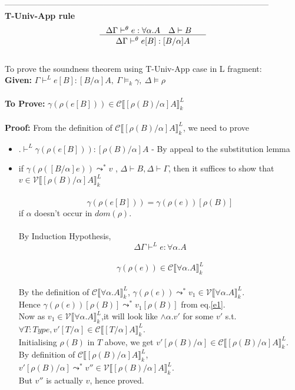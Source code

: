 \documentclass[12pt]{article}
\begin{document}
\\
\\
------------------------------------------------------------------------------------------------\\
\textbf{T-Univ-App rule}\\
$$
\inference{\Delta\Gamma \vdash^{\theta} e:\forall \alpha.A \quad \Delta \vdash
B \quad }{\Delta\Gamma \vdash^{\theta} e[B]:[B/\alpha]A}  
$$
\\
To prove the soundness theorem using T-Univ-App case in L fragment:\\
\textbf{Given:} $\Gamma \vdash^L  e [B] : [B/\alpha]A,\
\Gamma \vDash_k  \gamma,\ \Delta \vDash \rho$\\
\\
\textbf{To Prove:} $\gamma(\rho(e [B])) \in
\mathscr{C}\llbracket [\rho(B)/\alpha]A \rrbracket_k^L$\\
\\
\textbf{Proof:} From the definition of $\mathscr{C}\llbracket
[\rho(B)/\alpha]A \rrbracket_k^L$, we need to prove
\\
\begin{itemize} 
\item $. \vdash^L \gamma(\rho(e [B])) :  [\rho(B)/\alpha]A$
  - By appeal to the substitution lemma\\
\item if $ \gamma(\rho([B/\alpha]e)) \leadsto^{*} v$ ,
$\Delta \vdash B, \Delta \vdash \Gamma$, then it suffices to show that\\
$v \in \mathscr{V}\llbracket [\rho(B)/ \alpha] A
\rrbracket_k^L$\\
\\
\begin{equation} \label{e1}
\gamma(\rho(e [B])) = \gamma(\rho(e)) [\rho(B)]
\end{equation}
if $\alpha$ doesn't occur in $dom(\rho)$.\\
\\
By Induction Hypothesis,\\
$$
\Delta\Gamma \vdash^{L} e:\forall \alpha.A
$$\\
$$
\gamma(\rho(e)) \in
\mathscr{C}\llbracket\forall\alpha.A \rrbracket_k^L
$$\\
By the definition of $\mathscr{C}\llbracket\forall\alpha.A
\rrbracket_k^L$, $\gamma(\rho(e)) \leadsto^{*} v_1 \in \mathscr{V}\llbracket \forall\alpha.A
\rrbracket_k^L$.\\
Hence $\gamma(\rho(e)) [\rho(B)] \leadsto^{*} v_1 [\rho(B)]$ from eq.\ref{e1}.\\
Now as $v_1 \in \mathscr{V}\llbracket \forall\alpha.A \rrbracket_k^L$,it will look like $\wedge\alpha.v'$ for some $v'$ s.t. $\forall
T:Type, v'[T/\alpha] \in \mathscr{C}\llbracket [T/\alpha]A
\rrbracket^L_k$.\\
Initialising $\rho(B)$ in $T$ above, we get $v'[\rho(B)/\alpha] \in \mathscr{C}\llbracket [\rho(B)/\alpha]A
\rrbracket^L_k$.\\
By definition of $\mathscr{C}\llbracket [\rho(B)/\alpha]A
\rrbracket^L_k$, $v'[\rho(B)/\alpha] \leadsto^{*} v'' \in \mathscr{V}\llbracket [\rho(B)/\alpha]A
\rrbracket^L_k$.\\
But $v''$ is actually $v$, hence proved.

\end{itemize}
\end{document}
